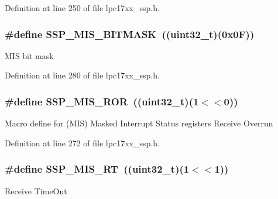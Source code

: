 \-Definition at line 250 of file lpc17xx\-\_\-ssp.\-h.

\hypertarget{group___s_s_p___private___macros_ga9571d63a5315c056b7a54e2f4736c1d7}{
\subsubsection[{\-S\-S\-P\-\_\-\-M\-I\-S\-\_\-\-B\-I\-T\-M\-A\-S\-K}]{\setlength{\rightskip}{0pt plus 5cm}\#define {\bf \-S\-S\-P\-\_\-\-M\-I\-S\-\_\-\-B\-I\-T\-M\-A\-S\-K}~((uint32\-\_\-t)(0x0\-F))}}\label{group___s_s_p___private___macros_ga9571d63a5315c056b7a54e2f4736c1d7}
\-M\-I\-S bit mask 

\-Definition at line 280 of file lpc17xx\-\_\-ssp.\-h.

\hypertarget{group___s_s_p___private___macros_ga5ab078b780d3ab049afbc4bf1d548164}{
\subsubsection[{\-S\-S\-P\-\_\-\-M\-I\-S\-\_\-\-R\-O\-R}]{\setlength{\rightskip}{0pt plus 5cm}\#define {\bf \-S\-S\-P\-\_\-\-M\-I\-S\-\_\-\-R\-O\-R}~((uint32\-\_\-t)(1$<$$<$0))}}\label{group___s_s_p___private___macros_ga5ab078b780d3ab049afbc4bf1d548164}
\-Macro define for (\-M\-I\-S) \-Masked \-Interrupt \-Status registers \-Receive \-Overrun 

\-Definition at line 272 of file lpc17xx\-\_\-ssp.\-h.

\hypertarget{group___s_s_p___private___macros_gac656007811dd29f2448a6a534aee04a3}{
\subsubsection[{\-S\-S\-P\-\_\-\-M\-I\-S\-\_\-\-R\-T}]{\setlength{\rightskip}{0pt plus 5cm}\#define {\bf \-S\-S\-P\-\_\-\-M\-I\-S\-\_\-\-R\-T}~((uint32\-\_\-t)(1$<$$<$1))}}\label{group___s_s_p___private___macros_gac656007811dd29f2448a6a534aee04a3}
\-Receive \-Time\-Out 

